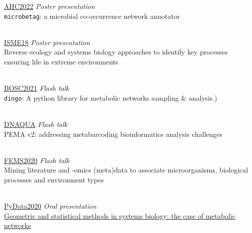 \documentclass[
	a4paper,
]{fortysecondscv}
\begin{document}
\begin{cvtable}


	

    	{\href{https://appliedhologenomicsconference.eu}{AHC2022}}
	    {\textit{Poster presentation} \\ \texttt{microbetag}: a microbial co-occurrence network annotator}{}

    \\

    	{\href{https://isme18.isme-microbes.org}{ISME18}}
	    {\textit{Poster presentation} \\ Reverse ecology and systems biology approaches to identify key processes ensuring life in extreme environments}{}

    \\


    	{\href{https://www.open-bio.org/events/bosc-2021/}{BOSC2021}}
	    {\textit{Flash talk} \\ \texttt{dingo}: A python library for metabolic networks sampling \& analysis.)}{}

    \\
    
    	{\href{https://symposium.inrae.fr/dnaqua-conference-evian2021/}{DNAQUA}}
	    {\textit{Flash talk} \\ PEMA v2: addressing metabarcoding bioinformatics analysis challenges}{}
	    
	\\

    	{\href{https://fems2020belgrade.com/}{FEMS2020}}
	    {\textit{Flash talk} \\ Mining literature and -omics (meta)data to associate microorganisms, biological processes and environment types}{}

    \\

    	{\href{https://pydata.org/global2020/}{PyData2020}}
	    {\textit{Oral presentation} \\ \href{https://www.youtube.com/watch?v=zg8KFZ_LbHM&t=1s}{Geometric and statistical methods in systems biology: the case of metabolic networks}}{}


\end{cvtable}
\end{document}

